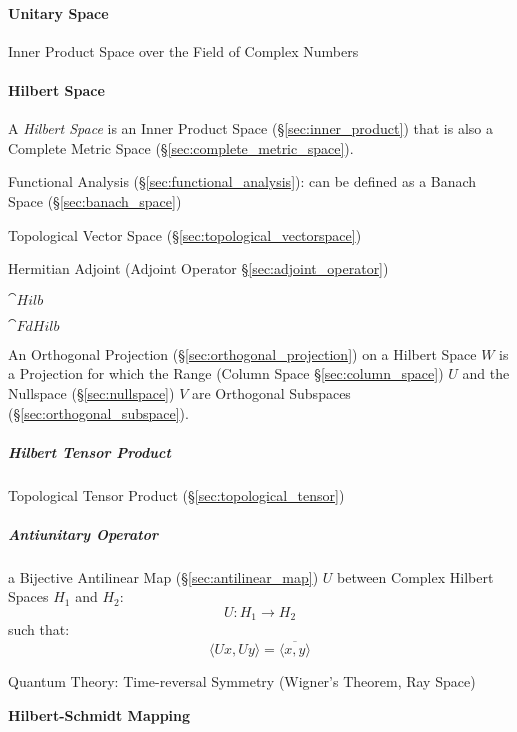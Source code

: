 \paragraph{Unitary Space}\label{sec:unitary_space}\hfill

Inner Product Space over the Field of Complex Numbers



\paragraph{Hilbert Space}\label{sec:hilbert_space}\hfill


A \emph{Hilbert Space} is an Inner Product Space (\S\ref{sec:inner_product})
that is also a Complete Metric Space (\S\ref{sec:complete_metric_space}).

Functional Analysis (\S\ref{sec:functional_analysis}): can be defined
as a Banach Space (\S\ref{sec:banach_space})

Topological Vector Space (\S\ref{sec:topological_vectorspace})

Hermitian Adjoint (Adjoint Operator \S\ref{sec:adjoint_operator})

$\cat{Hilb}$

$\cat{FdHilb}$

An Orthogonal Projection (\S\ref{sec:orthogonal_projection}) on a Hilbert Space
$W$ is a Projection for which the Range (Column Space \S\ref{sec:column_space})
$U$ and the Nullspace (\S\ref{sec:nullspace}) $V$ are Orthogonal Subspaces
(\S\ref{sec:orthogonal_subspace}).



\subparagraph{Hilbert Tensor Product}\label{sec:hilbert_tensor}\hfill

Topological Tensor Product (\S\ref{sec:topological_tensor})



\subparagraph{Antiunitary Operator}\label{sec:antiunitary_operator}\hfill

a Bijective Antilinear Map (\S\ref{sec:antilinear_map}) $U$ between Complex
Hilbert Spaces $H_1$ and $H_2$:
\[
  U : H_1 \rightarrow H_2
\]
such that:
\[
  \langle{Ux,Uy}\rangle = \overline{\langle{x,y}\rangle}
\]

Quantum Theory: Time-reversal Symmetry (Wigner's Theorem, Ray Space) %



\textbf{Hilbert-Schmidt Mapping}


